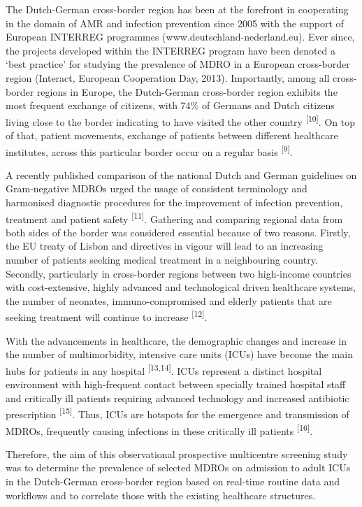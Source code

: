\documentclass[
]{book}
\begin{document}
The Dutch-German cross-border region has been at the forefront in cooperating in the domain of AMR and infection prevention since 2005 with the support of European INTERREG programmes (www.deutschland-nederland.eu). Ever since, the projects developed within the INTERREG program have been denoted a `best practice' for studying the prevalence of MDRO in a European cross-border region (Interact, European Cooperation Day, 2013). Importantly, among all cross-border regions in Europe, the Dutch-German cross-border region exhibits the most frequent exchange of citizens, with 74\% of Germans and Dutch citizens living close to the border indicating to have visited the other country \textsuperscript{{[}10{]}}. On top of that, patient movements, exchange of patients between different healthcare institutes, across this particular border occur on a regular basis \textsuperscript{{[}9{]}}.

A recently published comparison of the national Dutch and German guidelines on Gram-negative MDROs urged the usage of consistent terminology and harmonised diagnostic procedures for the improvement of infection prevention, treatment and patient safety \textsuperscript{{[}11{]}}. Gathering and comparing regional data from both sides of the border was considered essential because of two reasons. Firstly, the EU treaty of Lisbon and directives in vigour will lead to an increasing number of patients seeking medical treatment in a neighbouring country. Secondly, particularly in cross-border regions between two high-income countries with cost-extensive, highly advanced and technological driven healthcare systems, the number of neonates, immuno-compromised and elderly patients that are seeking treatment will continue to increase \textsuperscript{{[}12{]}}.

With the advancements in healthcare, the demographic changes and increase in the number of multimorbidity, intensive care units (ICUs) have become the main hubs for patients in any hospital \textsuperscript{{[}13,14{]}}. ICUs represent a distinct hospital environment with high-frequent contact between specially trained hospital staff and critically ill patients requiring advanced technology and increased antibiotic prescription \textsuperscript{{[}15{]}}. Thus, ICUs are hotspots for the emergence and transmission of MDROs, frequently causing infections in these critically ill patients \textsuperscript{{[}16{]}}.

Therefore, the aim of this observational prospective multicentre screening study was to determine the prevalence of selected MDROs on admission to adult ICUs in the Dutch-German cross-border region based on real-time routine data and workflows and to correlate those with the existing healthcare structures.
\end{document}
